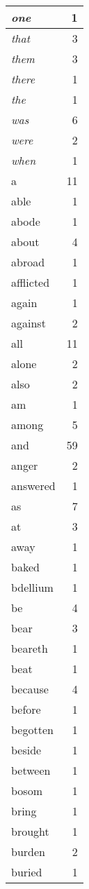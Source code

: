 \begin{center}
\begin{longtable}{l|r}
\emph{one} & 1 \\ \hline
\emph{that} & 3 \\ \hline
\emph{them} & 3 \\ \hline
\emph{there} & 1 \\ \hline
\emph{the} & 1 \\ \hline
\emph{was} & 6 \\ \hline
\emph{were} & 2 \\ \hline
\emph{when} & 1 \\ \hline
a & 11 \\ \hline
able & 1 \\ \hline
abode & 1 \\ \hline
about & 4 \\ \hline
abroad & 1 \\ \hline
afflicted & 1 \\ \hline
again & 1 \\ \hline
against & 2 \\ \hline
all & 11 \\ \hline
alone & 2 \\ \hline
also & 2 \\ \hline
am & 1 \\ \hline
among & 5 \\ \hline
and & 59 \\ \hline
anger & 2 \\ \hline
answered & 1 \\ \hline
as & 7 \\ \hline
at & 3 \\ \hline
away & 1 \\ \hline
baked & 1 \\ \hline
bdellium & 1 \\ \hline
be & 4 \\ \hline
bear & 3 \\ \hline
beareth & 1 \\ \hline
beat & 1 \\ \hline
because & 4 \\ \hline
before & 1 \\ \hline
begotten & 1 \\ \hline
beside & 1 \\ \hline
between & 1 \\ \hline
bosom & 1 \\ \hline
bring & 1 \\ \hline
brought & 1 \\ \hline
burden & 2 \\ \hline
buried & 1 \\ \hline

\end{longtable}
\end{center}
